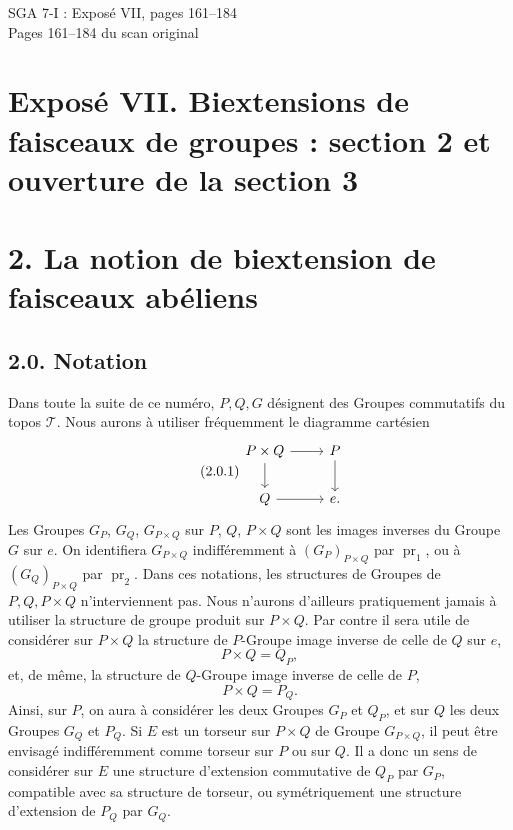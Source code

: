 \documentclass[11pt]{article}
\providecommand{\pr}{\operatorname{pr}}
\begin{document}
\begin{center}
{\Large SGA 7-I : Exposé VII, pages 161--184}\\[0.35em]
{\large Pages 161--184 du scan original}
\end{center}

\section*{Exposé VII. Biextensions de faisceaux de groupes : section 2 et ouverture de la section 3}

\section*{2. La notion de biextension de faisceaux abéliens}

\subsection*{2.0. Notation}
Dans toute la suite de ce numéro, \(P,Q,G\) désignent des Groupes commutatifs du topos \(\mathcal T\).  Nous aurons à utiliser fréquemment le diagramme cartésien
\begin{equation}\tag{2.0.1}
\begin{tikzcd}
P\times Q \arrow[r] \arrow[d] & P\arrow[d]\\
Q\arrow[r] & e .
\end{tikzcd}
\end{equation}
Les Groupes \(G_P\), \(G_Q\), \(G_{P\times Q}\) sur \(P\), \(Q\), \(P\times Q\) sont les images inverses du Groupe \(G\) sur \(e\).  On identifiera \(G_{P\times Q}\) indifféremment à \((G_P)_{P\times Q}\) par \(\pr_1\), ou à \((G_Q)_{P\times Q}\) par \(\pr_2\).  Dans ces notations, les structures de Groupes de \(P,Q,P\times Q\) n'interviennent pas.  Nous n'aurons d'ailleurs pratiquement jamais à utiliser la structure de groupe produit sur \(P\times Q\).  Par contre il sera utile de considérer sur \(P\times Q\) la structure de \(P\)-Groupe image inverse de celle de \(Q\) sur \(e\),
\begin{equation}\tag{2.0.2}
  P\times Q=Q_P,
\end{equation}
et, de même, la structure de \(Q\)-Groupe image inverse de celle de \(P\),
\begin{equation}\tag{2.0.3}
  P\times Q=P_Q.
\end{equation}
Ainsi, sur \(P\), on aura à considérer les deux Groupes \(G_P\) et \(Q_P\), et sur \(Q\) les deux Groupes \(G_Q\) et \(P_Q\).  Si \(E\) est un torseur sur \(P\times Q\) de Groupe \(G_{P\times Q}\), il peut être envisagé indifféremment comme torseur sur \(P\) ou sur \(Q\).  Il a donc un sens de considérer sur \(E\) une structure d'extension commutative de \(Q_P\) par \(G_P\), compatible avec sa structure de torseur, ou symétriquement une structure d'extension de \(P_Q\) par \(G_Q\).
\end{document}
